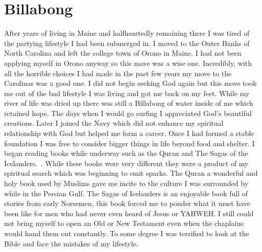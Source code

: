 \documentclass[11pt,a4paper]{scrartcl} %
\begin{document}
\section{Billabong}
\begin{doublespace}
After years of living in Maine and halfheartedly remaining there I was tired of the partying lifestyle I had been submerged in. I moved to the Outer Banks of North Carolina and left the college town of Orono in Maine. I had not been applying myself in Orono anyway so this move was a wise one. Incredibly, with all the horrible choices I had made in the past few years my move to the Carolinas was a good one. I did not begin seeking God again but this move took me out of the bad lifestyle I was living and got me back on my feet. While my river of life was dried up there was still a Billabong of water inside of me which retained hope. The days when I would go surfing I appreciated God's beautiful creations. Later I joined the Navy which did not enhance my spiritual relationship with God but helped me form a career. Once I had formed a stable foundation I was free to consider bigger things in life beyond food and shelter. I began reading books while underway such as the Quran and The Sagas of the Icelanders.~\citep{Viking}. While these books were very different they were a product of my spiritual search which was beginning to emit sparks. The Quran a wonderful and holy book used by Muslims gave me incite to the culture I was surrounded by while in the Persian Gulf. The Sagas of Icelanders is an enjoyable book full of stories from early Norsemen, this book forced me to ponder what it must have been like for men who had never even heard of Jesus or YAHWEH. I still could not bring myself to open an Old or New Testament even when the chaplains would hand them out constantly. To some degree I was terrified to look at the Bible and face the mistakes of my lifestyle. 
\end{doublespace}
\end{document}
